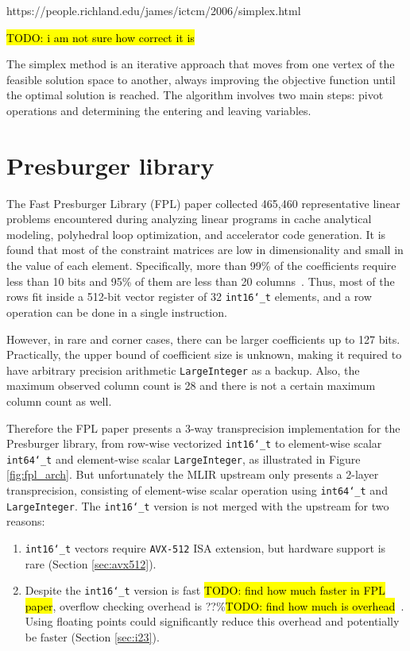 \documentclass[logo,bsc,singlespacing,parskip]{infthesis}
\newcommand{\dtshort}{\texttt{int16\char`_t}}
\newcommand{\dtlong}{\texttt{int64\char`_t}}
\newenvironment{compactlist}
{ \begin{enumerate}
    \setlength{\itemsep}{0pt}
    \setlength{\parskip}{0pt}
    \setlength{\parsep}{0pt}     
}
{ \end{enumerate} }
\begin{document}
https://people.richland.edu/james/ictcm/2006/simplex.html

\hl{TODO: i am not sure how correct it is}

The simplex method is an iterative approach that moves from one vertex of the
feasible solution space to another, always improving the objective function 
until the optimal solution is reached. The algorithm involves two main steps: 
pivot operations and determining the entering and leaving variables.







\section{Presburger library}
\label{sec:presburger}

The Fast Presburger Library (FPL) paper collected 465,460 representative linear
problems encountered during analyzing linear programs in cache analytical
modeling, polyhedral loop optimization, and accelerator code generation. It is
found that most of the constraint matrices are low in dimensionality and small
in the value of each element. Specifically, more than 99\% of the coefficients
require less than 10 bits and 95\% of them are less than 20 columns~\cite{FPL1}.
Thus, most of the rows fit inside a 512-bit vector register of 32
\dtshort{} elements, and a row operation can be done in a single
instruction. 

However, in rare and corner cases, there can be larger coefficients up to 127
bits. Practically, the upper bound of coefficient size is unknown, making it
required to have arbitrary precision arithmetic \texttt{LargeInteger} as a
backup. Also, the maximum observed column count is 28 and there is not a certain
maximum column count as well. 

Therefore the FPL paper presents a 3-way transprecision implementation for the
Presburger library, from row-wise vectorized \dtshort{} to element-wise
scalar \dtlong{} and element-wise scalar \texttt{LargeInteger}, as
illustrated in Figure \ref{fig:fpl_arch}. But unfortunately the MLIR upstream
only presents a 2-layer transprecision, consisting of element-wise scalar
operation using \dtlong{} and \texttt{LargeInteger}. The
\dtshort{} version is not merged with the upstream for two reasons: 
\begin{compactlist} 
    \item \dtshort{} vectors require \texttt{AVX-512} ISA extension, but hardware
    support is rare (Section \ref{sec:avx512}). 
    \item Despite the \dtshort{} version is fast \hl{TODO: find how much
    faster in FPL paper}, overflow checking overhead is ??\%\hl{TODO: find how
    much is overhead}~\cite{FPL2}. Using floating points could significantly
    reduce this overhead and potentially be faster (Section \ref{sec:i23}).  
\end{compactlist}
\end{document}
